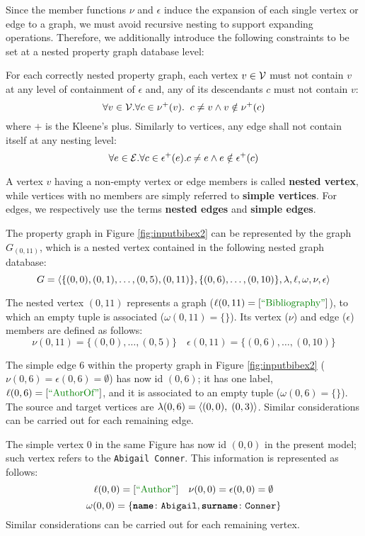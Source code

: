 Since the member functions $\nu$ and $\epsilon$ induce the expansion of each single vertex or edge to a graph, we must avoid recursive nesting to support expanding operations.
Therefore, we additionally introduce the following constraints to be set at a nested property graph database level:

\begin{axiom}
	For each correctly nested property graph, each vertex $v\in \mathcal{V}$ must not contain $v$ at any level of containment of $\epsilon$ and, any of its descendants $c$ must not contain $v$:
	\[\forall v\in \mathcal{V}. \forall c\in \nu^+(v).\;\; c\neq v\wedge v\notin \nu^+(c)\]
	where $+$ is the Kleene's plus. Similarly to vertices, any edge shall not contain itself at any nesting level:
	\[\forall e\in \mathcal{E}. \forall c\in \epsilon^+(e). c\neq e\wedge e\notin \epsilon^+(c)\]
\end{axiom}

A vertex $v$ having a non-empty vertex or edge members is called \textbf{nested vertex}, while vertices with no members are simply referred to \textbf{simple vertices}. For edges, we respectively use the terms \textbf{nested edges} and \textbf{simple edges}. 

\begin{ex}[label=exImpl]
The property graph in Figure \ref{fig:inputbibex2} can be represented by the graph $G_{(0,11)}$, which is a nested vertex contained in the following nested graph database:
\[G=\Braket{\{(0,0),(0,1),\dots,(0,5),(0,11)\}, \{(0,6),\dots,(0,10)\},\lambda,\ell,\omega,\nu,\epsilon}\]

The nested vertex $(0,11)$  represents a  graph ($\ell(0,11)=[\mstr{Bibliography}]$), to which an empty tuple is associated ($\omega(0,11)=\{\}$). Its vertex ($\nu$) and edge ($\epsilon$) members are defined as follows:
\[\nu(0,11)=\{(0,0),\dots,(0,5)\}\quad\epsilon(0,11)=\{(0,6),\dots,(0,10)\}\]

The simple edge $6$ within the property graph in Figure \ref{fig:inputbibex2} ($\nu(0,6)=\epsilon(0,6)=\emptyset$) has now id $(0,6)$; it has one label, $\ell(0,6)=[\mstr{AuthorOf}]$, and it is associated to an empty tuple ($\omega(0,6)=\{\}$).
The source and target vertices are 
$\lambda(0,6)=\Braket{(0,0),\;(0,3)}$. Similar considerations can be carried out for each  remaining edge.

The simple vertex $0$ in the same Figure has now id $(0,0)$ in the present model; such vertex refers to the  \texttt{Abigail Conner}. This information is represented as follows:
\[\ell(0,0)=[\mstr{Author}]\quad\nu(0,0)=\epsilon(0,0)=\emptyset\] \[\omega(0,0)=\{\texttt{\textbf{name}}\colon\texttt{Abigail},\texttt{\textbf{surname}}\colon\texttt{Conner}\}\]
Similar considerations can be carried out for each remaining vertex.

\end{ex}
